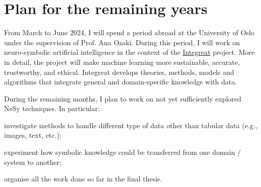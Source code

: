 \documentclass[]{scrartcl}
\begin{document}
    \section{Plan for the remaining years}
    \label{sec:todo}
    From March to June 2024, I will spend a period abroad at the University of Oslo under the supervision of Prof. Ana Ozaki.
    During this period, I will work on neuro-symbolic artificial intelligence in the context of the \href{https://www.integreat.no/index.html}{Integreat} project.
    More in detail, the project will make machine learning more sustainable, accurate, trustworthy, and ethical.
    Integreat develops theories, methods, models and algorithms that integrate general and domain-specific knowledge with data.

    During the remaining months, I plan to work on not yet sufficiently explored NeSy techniques.
    In particular:
    \begin{inlinelist}
        \item investigate methods to handle different type of data other than tabular data (e.g., images, text, etc.);
        \item experiment how symbolic knowledge could be transferred from one domain / system to another;
        \item organise all the work done so far in the final thesis.
    \end{inlinelist}


    
    
    
    
    
\end{document}
